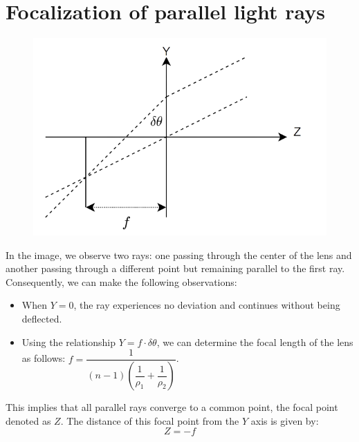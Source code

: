 \section{Focalization of parallel light rays}

\begin{figure}[H]
    \centering
    \includegraphics[width=0.4\linewidth]{images/focalization.png}
\end{figure}
In the image, we observe two rays: one passing through the center of the lens and another passing through a different point but remaining parallel to the first ray. 
Consequently, we can make the following observations:
\begin{itemize}
    \item When $Y = 0$, the ray experiences no deviation and continues without being deflected.
    \item Using the relationship $Y=f\cdot\delta\theta$, we can determine the focal length of the lens as follows: $f=\dfrac{1}{(n-1)\left(\dfrac{1}{\rho_1}+\dfrac{1}{\rho_2}\right)}$. 
\end{itemize}
This implies that all parallel rays converge to a common point, the focal point denoted as $Z$. 
The distance of this focal point from the $Y$ axis is given by:
\[Z=-f\]
